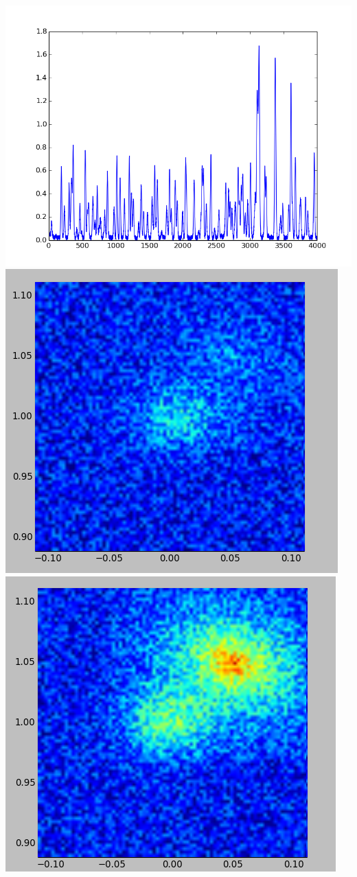 \documentclass[slidestop,compress,mathserif,color,12pt]{beamer}
\begin{document}
\begin{frame}
\begin{minipage}{0.62\linewidth}
\begin{itemize}
\end{itemize}
\end{minipage}
\begin{minipage}{0.33\linewidth}
\includegraphics[width=0.98\linewidth]{lines.png}\\
\includegraphics[width=0.68\linewidth]{image.png}\\
\includegraphics[width=0.68\linewidth]{image2.png}
\end{minipage}
\end{frame}
\end{document}
